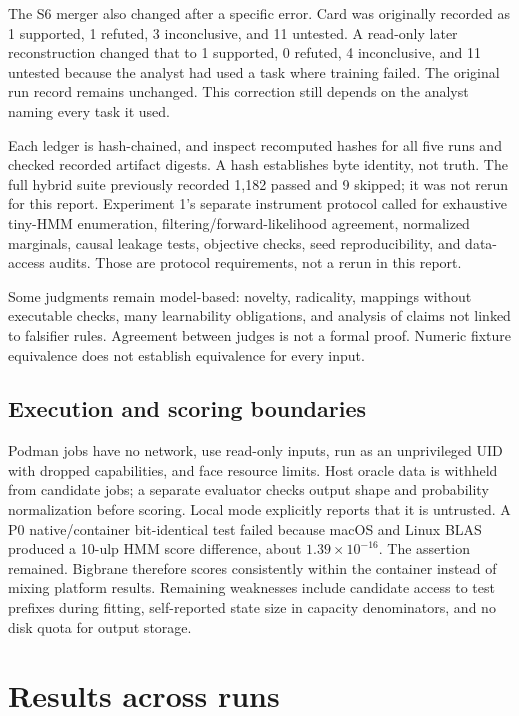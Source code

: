 The S6 merger also changed after a specific error. Card  was originally recorded as 1 supported, 1 refuted, 3 inconclusive, and 11 untested. A read-only later reconstruction changed that to 1 supported, 0 refuted, 4 inconclusive, and 11 untested because the analyst had used a task where training failed. The original run record remains unchanged. This correction still depends on the analyst naming every task it used.

Each ledger is hash-chained, and inspect recomputed hashes for all five runs and checked recorded artifact digests. A hash establishes byte identity, not truth. The full hybrid suite previously recorded 1,182 passed and 9 skipped; it was not rerun for this report. Experiment 1's separate instrument protocol called for exhaustive tiny-HMM enumeration, filtering/forward-likelihood agreement, normalized marginals, causal leakage tests, objective checks, seed reproducibility, and data-access audits. Those are protocol requirements, not a rerun in this report.

Some judgments remain model-based: novelty, radicality, mappings without executable checks, many learnability obligations, and analysis of claims not linked to falsifier rules. Agreement between judges is not a formal proof. Numeric fixture equivalence does not establish equivalence for every input.

\subsection{Execution and scoring boundaries}

Podman jobs have no network, use read-only inputs, run as an unprivileged UID with dropped capabilities, and face resource limits. Host oracle data is withheld from candidate jobs; a separate evaluator checks output shape and probability normalization before scoring. Local mode explicitly reports that it is untrusted. A P0 native/container bit-identical test failed because macOS and Linux BLAS produced a 10-ulp HMM score difference, about $1.39\times10^{-16}$. The assertion remained. Bigbrane therefore scores consistently within the container instead of mixing platform results. Remaining weaknesses include candidate access to test prefixes during fitting, self-reported state size in capacity denominators, and no disk quota for output storage.

\section{Results across runs}

